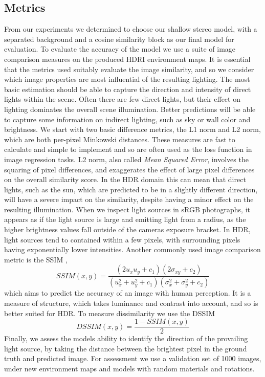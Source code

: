 \documentclass[ %
                    author={Gavin Parker},
                supervisor={Dr. Neill Campbell},
                    degree={MEng},
                     title={Deep Learning for Illumination Estimation from Stereo Images},
                  subtitle={},
                      type={Research},
                      year={2018} ]{dissertation}
\begin{document}
\subsection{Metrics}
From our experiments we determined to choose our shallow stereo model, with a separated background and a cosine similarity block as our final model for evaluation. To evaluate the accuracy of the model we use a suite of image comparison measures on the produced HDRI environment maps. It is essential that the metrics used suitably evaluate the image similarity, and so we consider which image properties are most influential of the resulting lighting. The most basic estimation should be able to capture the direction and intensity of direct lights within the scene. Often there are few direct lights, but their effect on lighting dominates the overall scene illumination. Better predictions will be able to capture some information on indirect lighting, such as sky or wall color and brightness.
\newline 
We start with two basic difference metrics, the L1 norm and L2 norm, which are both per-pixel Minkowski distances. These measures are fast to calculate and simple to implement and so are often used as the loss function in image regression tasks. L2 norm, also called \textit{Mean Squared Error}, involves the squaring of pixel differences, and exaggerates the effect of large pixel differences on the overall similarity score. In the HDR domain this can mean that direct lights, such as the sun, which are predicted to be in a slightly different direction, will have a severe impact on the similarity, despite having a minor effect on the resulting illumination. When we inspect light sources in sRGB photographs, it appears as if the light source is large and emitting light from a radius, as the higher brightness values fall outside of the cameras exposure bracket. In HDR, light sources tend to contained within a few pixels, with surrounding pixels having exponentially lower intensities.
\newline
Another commonly used image comparison metric is the SSIM \cite{1284395},
\[SSIM(x,y) = \frac{(2u_xu_y + c_1)(2\sigma_{xy} + c_2)}{(u^2_x + u^2_y + c_1)(\sigma^2_x + \sigma^2_y + c_2)}\]
which aims to predict the accuracy of an image with human perception. It is a measure of structure, which takes luminance and contrast into account, and so is better suited for HDR. To measure dissimilarity we use the DSSIM \[DSSIM(x,y) = \frac{1 - SSIM(x,y)}{2}\] Finally, we assess the models ability to identify the direction of the provailing light source, by taking the distance between the brightest pixel in the ground truth and predicted image. For assessment we use a validation set of 1000 images, under new environment maps and models with random materials and rotations.
\end{document}
